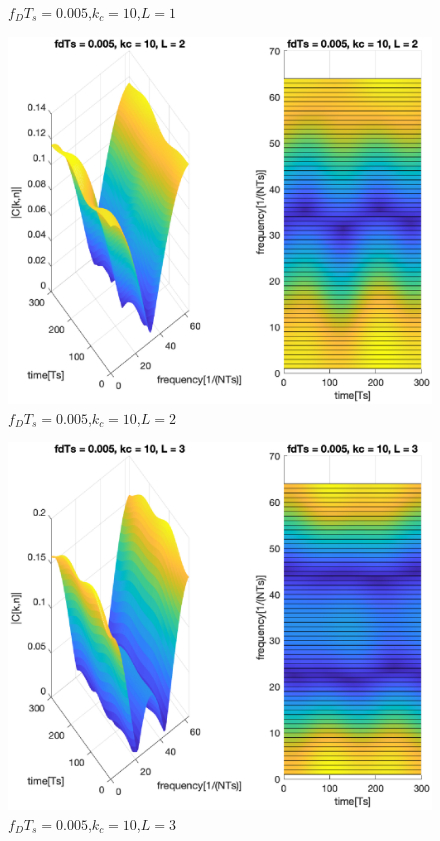 \documentclass[conference]{IEEEtran}
\begin{document}
\begin{appendices}
\begin{figure}[H]
        \caption{$f_{D}T_{s}=0.005$,$k_{c}=10$,$L=1$}
        \label{0005_10_1}
    \end{figure}
    \begin{figure}[H]
        \centering
        \includegraphics[width=\linewidth]{Task2/0005_10_2.eps}
        \caption{$f_{D}T_{s}=0.005$,$k_{c}=10$,$L=2$}
        \label{0005_10_2}
    \end{figure}
    \begin{figure}[H]
        \centering
        \includegraphics[width=\linewidth]{Task2/0005_10_3.eps}
        \caption{$f_{D}T_{s}=0.005$,$k_{c}=10$,$L=3$}
        \label{0005_10_3}
    \end{figure}
    \newpage

\end{appendices}
\end{document}
